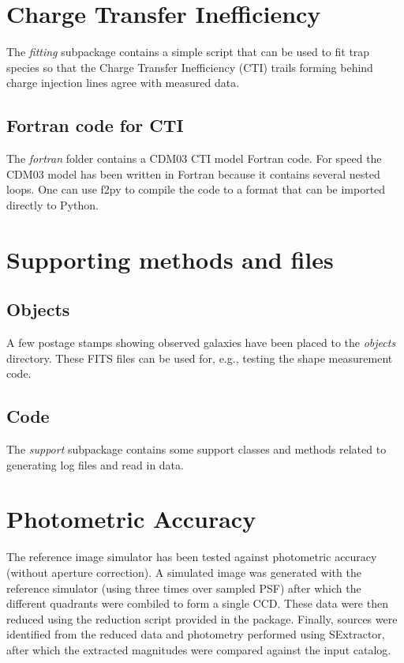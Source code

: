 \documentclass[a4paper,12pt,english]{sphinxmanual}
\begin{document}
\chapter{Charge Transfer Inefficiency}
\label{index:charge-transfer-inefficiency}
The \emph{fitting} subpackage contains a simple script that can be used to fit trap species so that the
Charge Transfer Inefficiency (CTI) trails forming behind charge injection lines agree with measured data.


\section{Fortran code for CTI}
\label{index:fortran-code-for-cti}
The \emph{fortran} folder contains a CDM03 CTI model Fortran code. For speed the CDM03 model has been written in Fortran
because it contains several nested loops. One can use f2py to compile the code to a format that can be imported
directly to Python.


\chapter{Supporting methods and files}
\label{index:supporting-methods-and-files}

\section{Objects}
\label{index:objects}
A few postage stamps showing observed galaxies have been placed to the \emph{objects} directory. These FITS files
can be used for, e.g., testing the shape measurement code.


\section{Code}
\label{index:code}
The \emph{support} subpackage contains some support classes and methods related to generating log files and read in
data.


\chapter{Photometric Accuracy}
\label{index:photometric-accuracy}
The reference image simulator has been tested against photometric accuracy (without aperture correction). A
simulated image was generated with the reference simulator (using three times over sampled PSF) after
which the different quadrants were combiled to form a single CCD. These data were then reduced using the
reduction script provided in the package. Finally, sources were identified from the reduced data and photometry performed
using SExtractor, after which the extracted magnitudes were compared against the input catalog.
\end{document}
